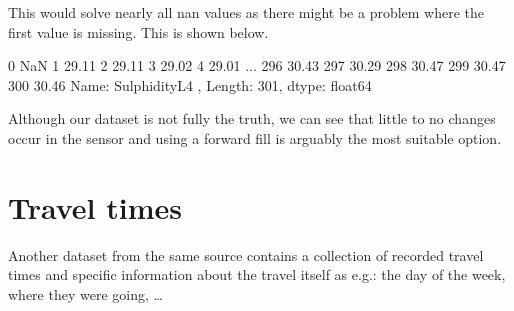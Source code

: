 \documentclass[letterpaper,10pt,english]{jupyterBook}
\begin{document}
\sphinxAtStartPar
This would solve nearly all nan values as there might be a problem where the first value is missing. This is shown below.

\begin{sphinxVerbatim}[commandchars=\\\{\}]
\PYG{p}{[}\PYG{p}{]}
\end{sphinxVerbatim}

\begin{sphinxVerbatim}[commandchars=\\\{\}]
0        NaN
1      29.11
2      29.11
3      29.02
4      29.01
       ...  
296    30.43
297    30.29
298    30.47
299    30.47
300    30.46
Name: SulphidityL\PYGZhy{}4 , Length: 301, dtype: float64
\end{sphinxVerbatim}

\sphinxAtStartPar
Although our dataset is not fully the truth, we can see that little to no changes occur in the sensor and using a forward fill is arguably the most suitable option.


\section{Travel times}
\label{\detokenize{c2_data_preparation/missing_data:travel-times}}
\sphinxAtStartPar
Another dataset from the same source contains a collection of recorded travel times and specific information about the travel itself as e.g.: the day of the week, where they were going, …

\begin{sphinxVerbatim}[commandchars=\\\{\}]
  
\end{sphinxVerbatim}
\end{document}
